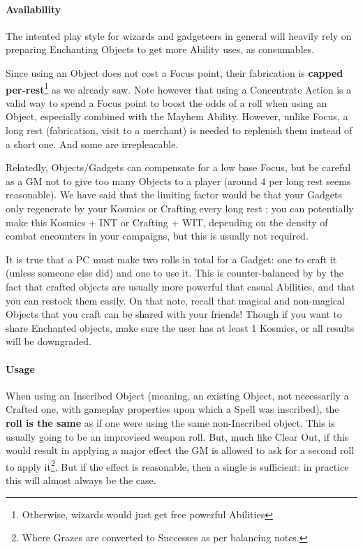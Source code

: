\paragraph{Availability}

The intented play style for wizards and gadgeteers in general will heavily rely on preparing Enchanting Objects to get more Ability uses, as consumables.

Since using an Object does not cost a Focus point, their fabrication is \textbf{capped per-rest}\footnote{Otherwise, wizards would just get free powerful Abilities} as we already saw. Note however that using a Concentrate Action is a valid way to spend a Focus point to boost the odds of a roll when using an Object, especially combined with the Mayhem Ability. However, unlike Focus, a long rest (fabrication, visit to a merchant) is needed to replenish them instead of a short one. And some are irrepleacable.

Relatedly, Objects/Gadgets can compensate for a low base Focus, but be careful as a GM not to give too many Objects to a player (around 4 per long rest seems reasonable). We have said that the limiting factor would be that your Gadgets only regenerate by your Kosmics or Crafting every long rest ; you can potentially make this Kosmics + INT or Crafting + WIT, depending on the density of combat encounters in your campaigns, but this is usually not required.

It is true that a PC must make two rolls in total for a Gadget: one to craft it (unless someone else did) and one to use it. This is counter-balanced by by the fact that crafted objects are usually more powerful that casual Abilities, and that you can restock them easily. On that note, recall that magical and non-magical Objects that you craft can be shared with your friends! Though if you want to share Enchanted objects, make sure the user has at least 1 Kosmics, or all results will be downgraded.


\paragraph{Usage}

When using an Inscribed Object (meaning, an existing Object, not necessarily a Crafted one, with gameplay properties upon which a Spell was inscribed), the \textbf{roll is the same} as if one were using the same non-Inscribed object. This is usually going to be an improvised weapon roll. But, much like Clear Out, if this would result in applying a major effect the GM is allowed to ask for a second roll to apply it\footnote{Where Grazes are converted to Successes as per balancing notes.}. But if the effect is reasonable, then a single is sufficient: in practice this will almost always be the case.

